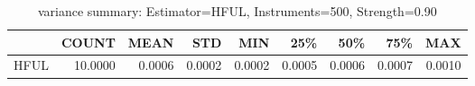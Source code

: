\begin{table}[ht]
\centering
\caption{variance summary: Estimator=HFUL, Instruments=500, Strength=0.90}
\begin{tabular}{lrrrrrrrr}
\toprule
 & COUNT & MEAN & STD & MIN & 25\% & 50\% & 75\% & MAX \\
\midrule
HFUL & 10.0000 & 0.0006 & 0.0002 & 0.0002 & 0.0005 & 0.0006 & 0.0007 & 0.0010 \\
\bottomrule
\end{tabular}
\end{table}
